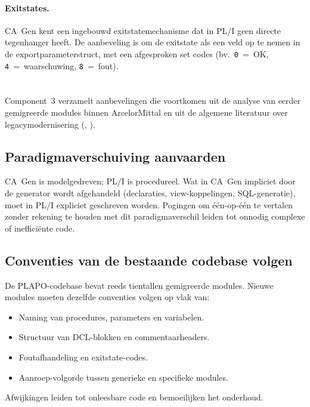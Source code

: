 \paragraph{Exitstates.} CA~Gen kent een ingebouwd exitstate\-mechanisme dat in PL/I geen directe 
tegenhanger heeft. De aanbeveling is om de exitstate als een veld op te nemen in de export\-parameterstruct, 
met een afgesproken set codes (bv.\ \texttt{0}~=~OK, \texttt{4}~=~waarschuwing, \texttt{8}~=~fout).

\section{}%
\label{sec:component-bestpractices}

Component~3 verzamelt aanbevelingen die voortkomen uit de analyse van eerder gemigreerde modules binnen 
ArcelorMittal en uit de algemene literatuur over legacy\-modernisering 
(\autocite{Orosz2022}, \autocite{Patel2024}).

\subsection{Paradigmaverschuiving aanvaarden}
\label{subsec:paradigma}

CA~Gen is modelgedreven; PL/I is procedureel. Wat in CA~Gen impliciet door de generator wordt afgehandeld 
(declaraties, view-koppelingen, SQL-generatie), moet in PL/I expliciet geschreven worden. Pogingen om 
één-op-één te vertalen zonder rekening te houden met dit paradigmaverschil leiden tot onnodig complexe of 
inefficiënte code.

\subsection{Conventies van de bestaande codebase volgen}
\label{subsec:conventies}

De PLAPO-codebase bevat reeds tientallen gemigreerde modules. Nieuwe modules moeten dezelfde conventies 
volgen op vlak van:
\begin{itemize}
    \item Naming van procedures, parameters en variabelen.
    \item Structuur van DCL-blokken en commentaarheaders.
    \item Foutafhandeling en exitstate-codes.
    \item Aanroep-volgorde tussen generieke en specifieke modules.
\end{itemize}
Afwijkingen leiden tot onleesbare code en bemoeilijken het onderhoud.

